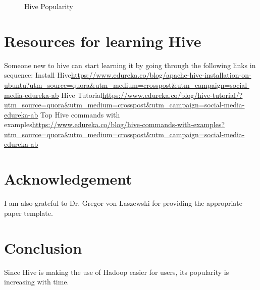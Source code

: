 \documentclass[9pt,twocolumn,twoside]{../../styles/osajnl}
\begin{document}
\begin{figure}[htbp]
	\centering
	\caption{Hive Popularity}
	\label{fig:HivePopularity}
\end{figure}
\cite{rank}

\section{Resources for learning Hive}
Someone new to hive can start learning it by going through the following links in sequence:
Install Hive\url{https://www.edureka.co/blog/apache-hive-installation-on-ubuntu?utm_source=quora&utm_medium=crosspost&utm_campaign=social-media-edureka-ab}\newline
Hive Tutorial\url{https://www.edureka.co/blog/hive-tutorial/?utm_source=quora&utm_medium=crosspost&utm_campaign=social-media-edureka-ab}\newline
Top Hive commands with examples\url{https://www.edureka.co/blog/hive-commands-with-examples?utm_source=quora&utm_medium=crosspost&utm_campaign=social-media-edureka-ab}\newline

\section{Acknowledgement}
I am also grateful to Dr. Gregor von Laszewski for providing the appropriate paper template.


\section{Conclusion}
Since Hive is making the use of Hadoop easier for users, its popularity is increasing with time.



\end{document}
